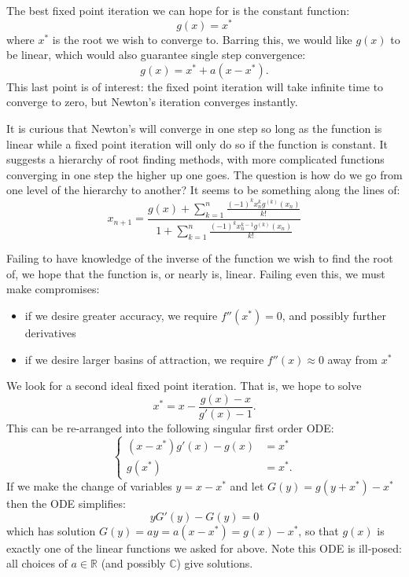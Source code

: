 \documentclass{book}
\begin{document}
The best fixed point iteration we can hope for is the constant function:
\begin{equation*}
g(x) = x^*
\end{equation*}
where $x^*$ is the root we wish to converge to.
Barring this, we would like $g(x)$ to be linear, which would also guarantee single step convergence:
\begin{equation*}
g(x) = x^* + a (x - x^*) .
\end{equation*}
This last point is of interest:
the fixed point iteration will take infinite time to converge to zero, but Newton's iteration converges instantly.

It is curious that Newton's will converge in one step so long as the function is linear while a fixed point iteration will only do so if the function is constant.
It suggests a hierarchy of root finding methods, with more complicated functions converging in one step the higher up one goes.
The question is how do we go from one level of the hierarchy to another?
It seems to be something along the lines of:
\begin{equation*}
x_{n+1} = \frac{g(x) + \sum_{k=1}^n \frac{(-1)^k x_n^k g^{(k)}(x_n)}{k!}}{1 + \sum_{k=1}^n \frac{(-1)^k x_n^{k-1} g^{(k)}(x_n)}{k!} }
\end{equation*}

Failing to have knowledge of the inverse of the function we wish to find the root of, we hope that the function is, or nearly is, linear.
Failing even this, we must make compromises:
\begin{itemize}
\item if we desire greater accuracy, we require $f''(x^*)=0$, and possibly further derivatives
\item if we desire larger basins of attraction, we require $f''(x) \approx 0$ away from $x^*$
\end{itemize}

We look for a second ideal fixed point iteration.
That is, we hope to solve
\begin{equation*}
x^* = x - \frac{g(x) - x}{g'(x) - 1} .
\end{equation*}
This can be re-arranged into the following singular first order ODE:
\begin{equation*}
\begin{cases} (x - x^*) g'(x) - g(x) & = x^* \\ g(x^*) & = x^*. \end{cases}
\end{equation*}
If we make the change of variables $y = x - x^*$ and let $G(y) = g(y + x^*) - x^*$ then the ODE simplifies:
\begin{equation*}
y G'(y) - G(y) = 0
\end{equation*}
which has solution $G(y) = a y = a (x - x^*) = g(x) - x^*$, so that $g(x)$ is exactly one of the linear functions we asked for above.
Note this ODE is ill-posed: all choices of $a \in \mathbb{R}$ (and possibly $\mathbb{C}$) give solutions.
\end{document}

